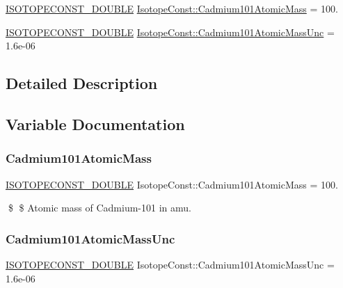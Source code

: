 \begin{DoxyCompactItemize}
\item 
\mbox{\hyperlink{group___isotope_const-_macros_ga8f45a7272ce02c0b4c65c44636ed719a}{I\+S\+O\+T\+O\+P\+E\+C\+O\+N\+S\+T\+\_\+\+D\+O\+U\+B\+LE}} \mbox{\hyperlink{group___isotope_const-_cadmium-_cd101_ga02774f409ee4d696dc69b041bfacc4f6}{Isotope\+Const\+::\+Cadmium101\+Atomic\+Mass}} = 100.
\item 
\mbox{\hyperlink{group___isotope_const-_macros_ga8f45a7272ce02c0b4c65c44636ed719a}{I\+S\+O\+T\+O\+P\+E\+C\+O\+N\+S\+T\+\_\+\+D\+O\+U\+B\+LE}} \mbox{\hyperlink{group___isotope_const-_cadmium-_cd101_ga9341b51574c81cd25afbc4bc2a6c7919}{Isotope\+Const\+::\+Cadmium101\+Atomic\+Mass\+Unc}} = 1.\+6e-\/06
\end{DoxyCompactItemize}


\subsection{Detailed Description}


\subsection{Variable Documentation}
\mbox{\label{group___isotope_const-_cadmium-_cd101_ga02774f409ee4d696dc69b041bfacc4f6}} 
\subsubsection{\texorpdfstring{Cadmium101\+Atomic\+Mass}{Cadmium101AtomicMass}}
{\footnotesize\ttfamily \mbox{\hyperlink{group___isotope_const-_macros_ga8f45a7272ce02c0b4c65c44636ed719a}{I\+S\+O\+T\+O\+P\+E\+C\+O\+N\+S\+T\+\_\+\+D\+O\+U\+B\+LE}} Isotope\+Const\+::\+Cadmium101\+Atomic\+Mass = 100.}

\$ \$ Atomic mass of Cadmium-\/101 in amu. \mbox{\label{group___isotope_const-_cadmium-_cd101_ga9341b51574c81cd25afbc4bc2a6c7919}} 
\subsubsection{\texorpdfstring{Cadmium101\+Atomic\+Mass\+Unc}{Cadmium101AtomicMassUnc}}
{\footnotesize\ttfamily \mbox{\hyperlink{group___isotope_const-_macros_ga8f45a7272ce02c0b4c65c44636ed719a}{I\+S\+O\+T\+O\+P\+E\+C\+O\+N\+S\+T\+\_\+\+D\+O\+U\+B\+LE}} Isotope\+Const\+::\+Cadmium101\+Atomic\+Mass\+Unc = 1.\+6e-\/06}

